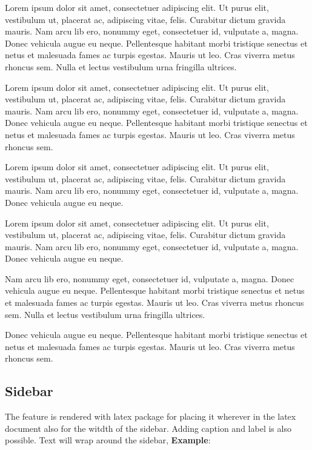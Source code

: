 \documentclass[12pt,a4paper]{report}
\begin{document}
\begin{note}
	Lorem ipsum dolor sit amet, consectetuer adipiscing elit. Ut purus elit, vestibulum ut, placerat ac, adipiscing vitae, felis. Curabitur dictum gravida mauris. Nam arcu lib ero, nonummy eget, consectetuer id, vulputate a, magna. Donec vehicula augue eu neque. Pellentesque habitant morbi tristique senectus et netus et malesuada fames ac turpis egestas. Mauris ut leo. Cras viverra metus rhoncus sem. Nulla et lectus vestibulum urna fringilla ultrices.
\end{note}
\begin{tip}
Lorem ipsum dolor sit amet, consectetuer adipiscing elit. Ut purus elit, vestibulum ut, placerat ac, adipiscing vitae, felis. Curabitur dictum gravida mauris. Nam arcu lib ero, nonummy eget, consectetuer id, vulputate a, magna. Donec vehicula augue eu neque. Pellentesque habitant morbi tristique senectus et netus et malesuada fames ac turpis egestas. Mauris ut leo. Cras viverra metus rhoncus sem.
\end{tip}
\begin{warning}
Lorem ipsum dolor sit amet, consectetuer adipiscing elit. Ut purus elit, vestibulum ut, placerat ac, adipiscing vitae, felis. Curabitur dictum gravida mauris. Nam arcu lib ero, nonummy eget, consectetuer id, vulputate a, magna. Donec vehicula augue eu neque. 
\end{warning}
\begin{error}
Lorem ipsum dolor sit amet, consectetuer adipiscing elit. Ut purus elit, vestibulum ut, placerat ac, adipiscing vitae, felis. Curabitur dictum gravida mauris. Nam arcu lib ero, nonummy eget, consectetuer id, vulputate a, magna. Donec vehicula augue eu neque.
\end{error}
\begin{note}
	Nam arcu lib ero, nonummy eget, consectetuer id, vulputate a, magna. Donec vehicula augue eu neque. Pellentesque habitant morbi tristique senectus et netus et malesuada fames ac turpis egestas. Mauris ut leo. Cras viverra metus rhoncus sem. Nulla et lectus vestibulum urna fringilla ultrices.
\end{note}
\begin{tip}
Donec vehicula augue eu neque. Pellentesque habitant morbi tristique senectus et netus et malesuada fames ac turpis egestas. Mauris ut leo. Cras viverra metus rhoncus sem.
\end{tip}

\subsection{Sidebar}
The  feature is rendered with  latex package for placing it wherever in the latex document also for the witdth of the sidebar. Adding caption and label is also possible. Text will wrap around the sidebar, \textbf{Example}:
\end{document}
